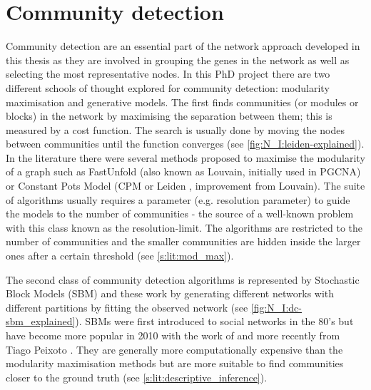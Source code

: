 \section{Community detection} \label{s:lit:comm_detect}

\vspace{3mm}
\vspace{3mm}

Community detection are an essential part of the network approach developed in this thesis as they are involved in grouping the genes in the network as well as selecting the most representative nodes. In this PhD project there are two different schools of thought explored for community detection: modularity maximisation and generative models. The first finds communities (or modules or blocks) in the network by maximising the separation between them; this is measured by a cost function. The search is usually done by moving the nodes between communities until the function converges (see \cref{fig:N_I:leiden-explained}). In the literature there were several methods proposed to maximise the modularity of a graph such as FastUnfold \citep{Blondel2008-ik} (also known as Louvain, initially used in PGCNA) or Constant Pots Model (CPM or Leiden \citet{Traag2019-ne}, improvement from Louvain). The suite of algorithms usually requires a parameter (e.g. resolution parameter) to guide the models to the number of communities - the source of a well-known problem with this class known as the resolution-limit. The algorithms are restricted to the number of communities and the smaller communities are hidden inside the larger ones after a certain threshold (see \cref{s:lit:mod_max}).

The second class of community detection algorithms is represented by Stochastic Block Models (SBM) and these work by generating different networks with different partitions by fitting the observed network (see \cref{fig:N_I:dc-sbm_explained}). SBMs were first introduced to social networks \citep{Holland1983-eu} in the 80's but have become more popular in 2010 with the work of \citet{Karrer2011-si} and more recently from Tiago Peixoto \citep{Peixoto2014-ls,Peixoto2017-ua,Peixoto2018-ot,Peixoto2019-fg,Peixoto2023-mw,Peixoto2024-mu}. They are generally more computationally expensive than the modularity maximisation methods but are more suitable to find communities closer to the ground truth (see \cref{s:lit:descriptive_inference}).

